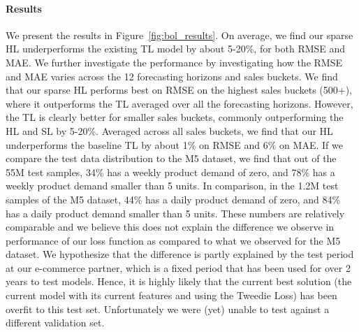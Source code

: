 \documentclass[preprint, 3p, times, twocolumn]{elsarticle}
\begin{document}
  \paragraph{Results} We present the results in Figure~\ref{fig:bol_results}. On average, we find our sparse HL underperforms the existing TL model by about 5-20\%, for both RMSE and MAE. We further investigate the performance by investigating how the RMSE and MAE varies across the 12 forecasting horizons and sales buckets. We find that our sparse HL performs best on RMSE on the highest sales buckets (500+), where it outperforms the TL averaged over all the forecasting horizons. However, the TL is clearly better for smaller sales buckets, commonly outperforming the HL and SL by 5-20\%. Averaged across all sales buckets, we find that our HL underperforms the baseline TL by about 1\% on RMSE and 6\% on MAE. If we compare the test data distribution to the M5 dataset, we find that out of the 55M test samples, 34\% has a weekly product demand of zero, and 78\% has a weekly product demand smaller than 5 units. In comparison, in the 1.2M test samples of the M5 dataset, 44\% has a daily product demand of zero, and 84\% has a daily product demand smaller than 5 units. These numbers are relatively comparable and we believe this does not explain the difference we observe in performance of our loss function as compared to what we observed for the M5 dataset. We hypothesize that the difference is partly explained by the test period at our e-commerce partner, which is a fixed period that has been used for over 2 years to test models. Hence, it is highly likely that the current best solution (the current model with its current features and using the Tweedie Loss) has been overfit to this test set. Unfortunately we were (yet) unable to test against a different validation set.
\end{document}
